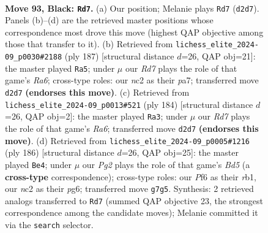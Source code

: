 \documentclass[11pt]{article}
\begin{document}
\clearpage

\begin{figure}[p]\centering
\begin{subfigure}{0.46\textwidth}\centering
\resizebox{\linewidth}{!}{%
\newchessgame
\chessboard[
  setfen={8/5kp1/5p2/7p/7P/6P1/1RNr4/4K3 b - - 11 93},
  showmover=false,
  pgfstyle=straightmove, color=movearrow, markmove={d2-d7}
]}
\caption{}
\end{subfigure}\hfill
\begin{subfigure}{0.46\textwidth}\centering
\resizebox{\linewidth}{!}{%
\newchessgame
\chessboard[
  setfen={8/P5R1/2k5/2pp4/5p2/r4P2/1K3P2/8 b - - 1 94},
  showmover=false,
  pgfstyle=straightmove, color=movearrow, markmove={a3-a5}
]}
\caption{}
\end{subfigure}
\\[4pt]
\begin{subfigure}{0.46\textwidth}\centering
\resizebox{\linewidth}{!}{%
\newchessgame
\chessboard[
  setfen={8/6k1/R5p1/7p/1r5P/6P1/5PK1/8 w - - 65 93},
  showmover=false,
  pgfstyle=straightmove, color=movearrow, markmove={a6-a3}
]}
\caption{}
\end{subfigure}\hfill
\begin{subfigure}{0.46\textwidth}\centering
\resizebox{\linewidth}{!}{%
\newchessgame
\chessboard[
  setfen={8/4k3/5Rp1/3B2Pp/7P/6K1/8/1r6 w - - 17 94},
  showmover=false,
  pgfstyle=straightmove, color=movearrow, markmove={d5-e4}
]}
\caption{}
\end{subfigure}
\caption{\textbf{Move 93, Black: \texttt{Rd7}.} (a) Our position; Melanie plays \texttt{Rd7} (\texttt{d2d7}). Panels (b)--(d) are the retrieved master positions whose correspondence most drove this move (highest QAP objective among those that transfer to it). (b) Retrieved from \texttt{lichess\_elite\_2024-09\_p0030\#2188} (ply 187) [structural distance $d$=26, QAP obj=21]: the master played \texttt{Ra5}; under $\mu$ our \emph{Rd7} plays the role of that game's \emph{Ra6}; cross-type roles: our \emph{n}c2 as their \emph{p}a7; transferred move \texttt{d2d7} \textbf{(endorses this move)}. (c) Retrieved from \texttt{lichess\_elite\_2024-09\_p0013\#521} (ply 184) [structural distance $d$=26, QAP obj=2]: the master played \texttt{Ra3}; under $\mu$ our \emph{Rd7} plays the role of that game's \emph{Ra6}; transferred move \texttt{d2d7} \textbf{(endorses this move)}. (d) Retrieved from \texttt{lichess\_elite\_2024-09\_p0005\#1216} (ply 186) [structural distance $d$=26, QAP obj=25]: the master played \texttt{Be4}; under $\mu$ our \emph{Pg2} plays the role of that game's \emph{Bd5} (a \textbf{cross-type} correspondence); cross-type roles: our \emph{P}f6 as their \emph{r}b1, our \emph{n}c2 as their \emph{p}g6; transferred move \texttt{g7g5}. Synthesis: 2 retrieved analogs transferred to \texttt{Rd7} (summed QAP objective 23, the strongest correspondence among the candidate moves); Melanie committed it via the \texttt{search} selector.}
\label{fig:thought-m185}
\end{figure}
\end{document}
